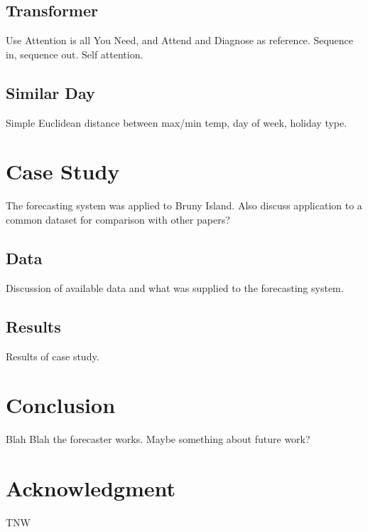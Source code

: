 \documentclass[conference]{IEEEtran}
\begin{document}
\subsection{Transformer}
Use Attention is all You Need, and Attend and Diagnose as reference.
Sequence in, sequence out. Self attention.

\subsection{Similar Day}
Simple Euclidean distance between max/min temp, day of week, holiday type.

\section{Case Study}
The forecasting system was applied to Bruny Island.
Also discuss application to a common dataset for comparison with other papers?

\subsection{Data}
Discussion of available data and what was supplied to the forecasting system.

\subsection{Results}
Results of case study.

\section{Conclusion}
Blah Blah the forecaster works.
Maybe something about future work?


\section*{Acknowledgment}
TNW




\end{document}
